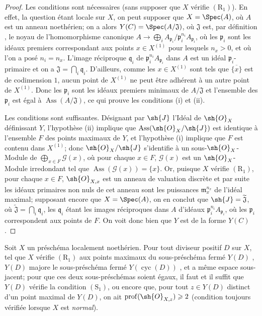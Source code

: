 \begin{proof}
Les conditions sont nécessaires (sans supposer que $X$ vérifie $(\mathrm{R}_1)$).
En effet, la question étant locale sur $X$, on peut supposer que $X=\Spec(A)$, où $A$ est un anneau noethérien;
on a alors $Y(C)=\Spec(A/\mathfrak{J})$, où $\mathfrak{J}$ est, par définition , le noyau de l'homomorphisme canonique $A\to\bigoplus_i A_{\mathfrak{p}_i}/\mathfrak{p}_i^{n_i}A_{\mathfrak{p}_i}$, où les $\mathfrak{p}_i$ sont les idéaux premiers correspondant aux points $x\in X^{(1)}$ pour lesquels $n_x>0$, et où l'on a posé $n_i=n_x$.
L'image réciproque $\mathfrak{q}_i$ de $\mathfrak{p}_i^{n_i}A_{\mathfrak{p}_i}$ dans $A$ est un idéal $\mathfrak{p}_i$-primaire et on a $\mathfrak{J}=\bigcap_i\mathfrak{q}_i$.
D'ailleurs, comme les $x\in X^{(1)}$ sont tels que $\overline{\{x\}}$ est de codimension $1$, aucun point de $X^{(1)}$ ne peut être adhérent à un autre point de $X^{(1)}$.
Donc les $\mathfrak{p}_i$ sont les idéaux premiers minimaux de $A/\mathfrak{J}$ et l'ensemble des $\mathfrak{p}_i$ est égal à $\operatorname{Ass}(A/\mathfrak{J})$, ce qui prouve les conditions (i) et (ii).

Les conditions sont suffisantes.
Désignant par $\sh{J}$ l'Idéal de $\sh{O}_X$ définissant $Y$, l'hypothèse (ii) implique que $\operatorname{Ass}(\sh{O}_X/\sh{J})$ est identique à l'ensemble $F$ des points maximaux de $Y$, et l'hypothèse (i) implique que $F$ est contenu dans $X^{(1)}$;
donc  $\sh{O}_X/\sh{J}$ s'identifie à un sous-$\sh{O}_X$-Module de $\bigoplus_{x\in F}\mathscr{G}(x)$, où pour chaque $x\in F$, $\mathscr{G}(x)$ est un $\sh{O}_X$-Module irredondant tel que $\operatorname{Ass}(\mathscr{G}(x))=\{x\}$.
Or, puisque $X$ vérifie $(\mathrm{R}_1)$, pour chaque $x\in F$, $\sh{O}_{X,x}$ est un anneau de valuation discrète et par suite les idéaux primaires non nuls de cet anneau sont les puissances $\mathfrak{m}_x^{n_x}$ de l'idéal maximal;
supposant encore que $X=\Spec(A)$, on en conclut que $\sh{J}=\widetilde{\mathfrak{J}}$, où $\widetilde{\mathfrak{J}}=\bigcap_i\mathfrak{q}_i$, les $\mathfrak{q}_i$ étant les images réciproques dans $A$ d'idéaux $\mathfrak{p}_i^{n_i}A_{\mathfrak{p}_i}$, où les $\mathfrak{p}_i$ correspondent aux points de $F$.
On voit donc bien que $Y$ est de la forme $Y(C)$.
\end{proof}

\begin{corollary}[21.7.3]
\label{IV.21.7.3}
Soit $X$ un préschéma localement noethérien.
Pour tout diviseur positif $D$ sur $X$, tel que $X$ vérifie $(\mathrm{R}_1)$ aux points maximaux du sous-préschéma fermé $Y(D)$ , $Y(D)$ majore le sous-préschéma fermé $Y(\operatorname{cyc}(D))$ , et a même espace sous-jacent;
pour que ces deux sous-préschémas soient égaux, il faut et il suffit que $Y(D)$ vérifie la condition $(\mathrm{S}_1)$, ou encore que, pour tout $z\in Y(D)$ distinct d'un point maximal de $Y(D)$, on ait $\operatorname{prof}(\sh{O}_{X,z})\geq2$ (condition toujours vérifiée lorsque $X$ est \emph{normal}).
\end{corollary}

